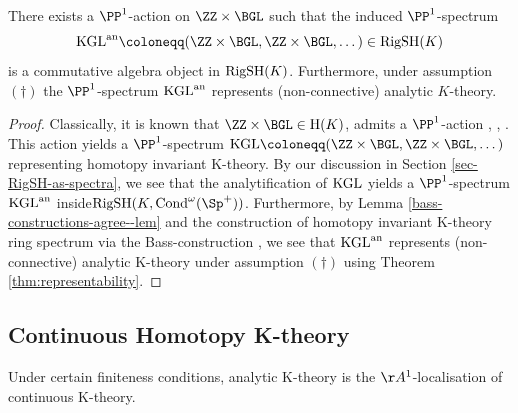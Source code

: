 \documentclass[colorinlistoftodos,article,11pt,reqno]{article}
\newcommand{\RigSH}{\textup{RigSH}}
\newcommand{\Cond}{\textup{Cond}}
\newcommand{\an}{\textup{an}}
\newcommand{\Arig}{\AA^{1}}
\begin{document}
\begin{cor}
\label{cor-K-P1-spectrum}
  There exists a $\PP^1$-action on $\ZZ\times\BGL$ such that the induced $\PP^1$-spectrum
    $$
    \textup{KGL}^{\an}\coloneqq (\ZZ\times\BGL,\ZZ\times\BGL,\dots)\in \RigSH(K)
    $$
    is a commutative algebra object in $\RigSH(K)$. Furthermore, under assumption $(\dagger)$ the $\PP^1$-spectrum $\textup{KGL}^{\an}$ represents (non-connective) analytic $K$-theory.
\end{cor}
\begin{proof}
    Classically, it is known that $\ZZ\times \BGL\in \textup{H}(K)$, admits a $\PP^1$-action \cite[\S 6.2]{voevodsky-icm-1998}, \cite{PPR-KGL}, \cite[\S 3.2]{MotCoh}.
    This action yields a $\PP^1$-spectrum $\textup{KGL}\coloneqq(\ZZ\times \BGL,\ZZ\times \BGL,\dots)$ representing homotopy invariant K-theory. By our discussion in Section \ref{sec-RigSH-as-spectra}, we see that the analytification of $\textup{KGL}$ yields a $\PP^1$-spectrum $\textup{KGL}^{\an}$ inside\linebreak $\RigSH(K,\Cond^{\omega}(\Sp^+))$. Furthermore, by Lemma \ref{bass-constructions-agree--lem} and the construction of homotopy invariant K-theory ring spectrum via the Bass-construction \cite{k-book}, we see that $\textup{KGL}^{\an}$ represents (non-connective) analytic K-theory under assumption $(\dagger)$ using Theorem \ref{thm:representability}.
\end{proof}


\subsection{Continuous Homotopy K-theory}

\vspace{6pt}\noindent Under certain finiteness conditions, analytic K-theory is the $\Arig$-localisation of continuous K-theory.
\end{document}
